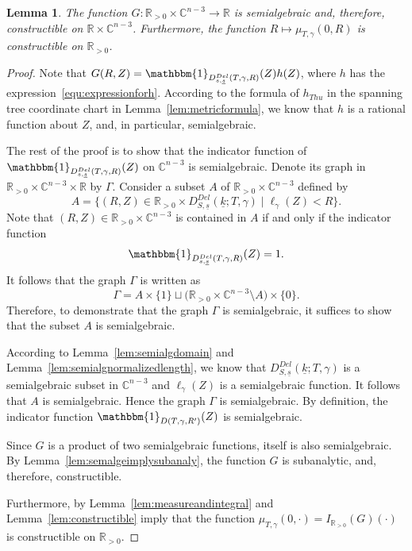 \documentclass{compositio}
\numberwithin{equation}{section}
\numberwithin{figure}{section}
\theoremstyle{definition}
\theoremstyle{plain}
\newtheorem{lemma}[definition]{Lemma}
\begin{document}
{\begin{lemma}\label{lem:gisconstructible}
    The function $G: \mathbb{R}_{>0} \times \mathbb{C}^{n-3} \to \mathbb{R}$ is semialgebraic and, therefore, constructible on $\mathbb{R} \times \mathbb{C}^{n-3}$. Furthermore, the function $R\mapsto \mu_{T,\gamma}(0,R)$ is constructible on $\mathbb{R}_{>0}$.  
\end{lemma}

\begin{proof}
    Note that $G(R, Z)=\mathbbm{1}_{D_{s,\underline{s}}^{Del}(T,\gamma,R)}(Z)h(Z)$, where $h$ has the expression~\eqref{equ:expressionforh}. According to the formula of $h_{Thu}$ in the spanning tree coordinate chart in Lemma~\ref{lem:metricformula}, we know that $h$ is a rational function about $Z$, and, in particular, semialgebraic. 
    
    The rest of the proof is to show that the indicator function of $\mathbbm{1}_{D_{s,\underline{s}}^{Del}(T,\gamma,R)}(Z)$ on $\mathbb{C}^{n-3}$ is semialgebraic. Denote its graph in $\mathbb{R}_{>0}\times\mathbb{C}^{n-3}\times\mathbb{R}$ by $\Gamma$. Consider a subset $A$ of $\mathbb{R}_{>0}\times\mathbb{C}^{n-3}$ defined by
    $$
    A=\{(R,Z)\in \mathbb{R}_{>0}\times D_{S,\underline{s}}^{Del}(\underline{k};T, \gamma)\mid \ell_{\gamma}(Z)<R\}.$$
    Note that $(R,Z)\in \mathbb{R}_{>0}\times\mathbb{C}^{n-3}$ is contained in $A$ if and only if the indicator function $$\mathbbm{1}_{D_{s,\underline{s}}^{Del}(T,\gamma,R)}(Z) = 1.$$ 
    It follows that the graph $\Gamma$ is written as
    $$\Gamma=A\times\{1\} \sqcup \big(\mathbb{R}_{>0}\times\mathbb{C}^{n-3}\setminus A\big)\times \{0\}.$$
    Therefore, to demonstrate that the graph $\Gamma$ is semialgebraic, it suffices to show that the subset $A$ is semialgebraic.

    According to Lemma~\ref{lem:semialgdomain} and Lemma~\ref{lem:semialgnormalizedlength}, we know that $D_{S,\underline{s}}^{Del}(\underline{k};T, \gamma)$ is a semialgebraic subset in $\mathbb{C}^{n-3}$ and $\ell_{\gamma}(Z)$ is a semialgebraic function. It follows that $A$ is semialgebraic. Hence the graph $\Gamma$ is semialgebraic. By definition, the indicator function $\mathbbm{1}_{D(T,\gamma, R')}(Z)$ is semialgebraic.

    Since $G$ is a product of two semialgebraic functions, itself is also semialgebraic. By Lemma~\ref{lem:semalgeimplysubanaly}, the function $G$ is subanalytic, and, therefore, constructible.

    Furthermore, by Lemma~\ref{lem:measureandintegral} and Lemma~\ref{lem:constructible} imply that the function $\mu_{T,\gamma}(0,\cdot) = I_{\mathbb{R}_{>0}}(G)(\cdot)$ is constructible on $\mathbb{R}_{>0}$.
\end{proof}

}
\end{document}
